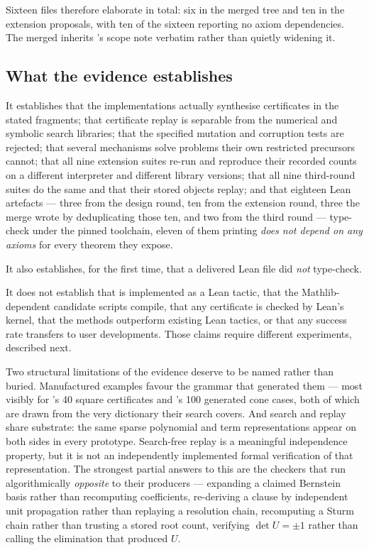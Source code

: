 Sixteen files therefore elaborate in total: six in the merged tree and ten in
the extension proposals, with ten of the sixteen reporting no axiom
dependencies. The merged  inherits 's scope note
verbatim rather than quietly widening it.

\subsection{What the evidence establishes}

It establishes that the implementations actually synthesise certificates in the
stated fragments; that certificate replay is separable from the numerical and
symbolic search libraries; that the specified mutation and corruption tests are
rejected; that several mechanisms solve problems their own restricted precursors
cannot; that all nine extension suites re-run and reproduce their recorded
counts on a different interpreter and different library versions; that all
nine third-round suites do the same and that their stored objects replay; and
that eighteen Lean artefacts --- three from the design round, ten from the
extension round, three the merge wrote by deduplicating those ten, and two from
the third round --- type-check under the pinned toolchain, eleven of them
printing \emph{does not depend on any axioms} for every theorem they expose.

It also establishes, for the first time, that a delivered Lean file did
\emph{not} type-check.

It does not establish that \forge{} is implemented as a Lean tactic, that the
Mathlib-dependent candidate scripts compile, that any certificate is checked by
Lean's kernel, that the methods outperform existing Lean tactics, or that any
success rate transfers to user developments. Those claims require different
experiments, described next.

Two structural limitations of the evidence deserve to be named rather than
buried. Manufactured examples favour the grammar that generated them --- most
visibly for 's 40 square certificates and 's 100 generated cone
cases, both of which are drawn from the very dictionary their search covers. And
search and replay share substrate: the same sparse polynomial and term
representations appear on both sides in every prototype. Search-free replay is a
meaningful independence property, but it is not an independently implemented
formal verification of that representation. The strongest partial answers to
this are the checkers that run algorithmically \emph{opposite} to their
producers --- expanding a claimed Bernstein basis rather than recomputing
coefficients, re-deriving a clause by independent unit propagation rather than
replaying a resolution chain, recomputing a Sturm chain rather than trusting a
stored root count, verifying $\det U=\pm1$ rather than calling the elimination
that produced $U$.

